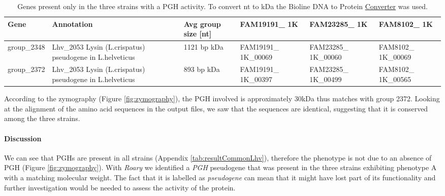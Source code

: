 \documentclass[10pt,a4paper]{article}
\begin{document}
\begin{table}[htbp]
	\centering
	\begin{tabularx}{\linewidth}{|X|X|X|X|X|X|}
		\hline
		\textbf{Gene} & \textbf{Annotation} & \textbf{Avg group size [nt]} & \textbf{FAM19191\_ 1K} & \textbf{FAM23285\_ 1K} & \textbf{FAM8102\_ 1K}\\
		 \hline
		group\_2348 & Lhv\_2053 Lysin (L.crispatus) pseudogene in L.helveticus & 1121 bp  \newline     41 kDa & FAM19191\_ 1K\_00069 & FAM23285\_ 1K\_00060 & FAM8102\_ 1K\_00069 \\
		\hline
		group\_2372 & Lhv\_2053 Lysin (L.crispatus) pseudogene in L.helveticus & 893 bp    \newline    33 kDa & FAM19191\_ 1K\_00397 & FAM23285\_ 1K\_00499 & FAM8102\_ 1K\_00565 \\
		\hline	
	\end{tabularx}
	\caption{Genes present only in the three strains with a PGH activity. To convert nt to kDa the Bioline DNA to Protein \href{https://www.bioline.com/us/media/calculator/01_06.html}{Converter} was used.}
	\label{tab:resultPGHexpr}
\end{table}

\noindent According to the zymography (Figure \ref{fig:zymography}), the PGH involved is approximately 30kDa thus matches with group 2372. Looking at the alignment of the amino acid sequences in the output files,
we saw that the sequences are identical, suggesting that it is conserved among the three strains. \\


\paragraph{Discussion} We can see that PGHs are present in all strains (Appendix \ref{tab:resultCommonLhv}), therefore the phenotype is not due to an absence of PGH (Figure \ref{fig:zymography}). With \textit{Roary} we identified a \textit{PGH} pseudogene that was present in the three strains exhibiting phenotype A with a matching molecular weight. The fact that it is labelled as \textit{pseudogene} can mean that it might have lost part of its functionality and further investigation would be needed to assess the activity of the protein.\\
\end{document}
